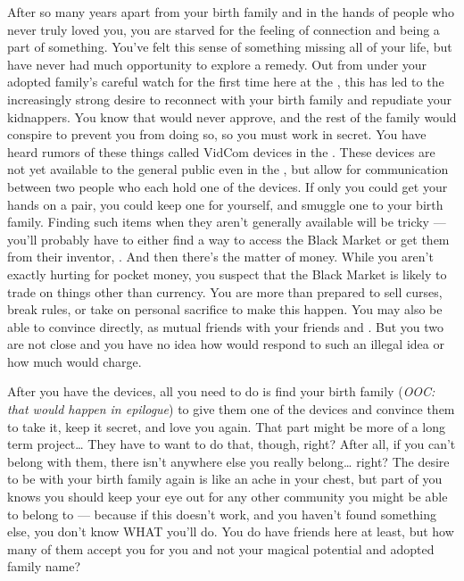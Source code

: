 \documentclass[char]{GL2020}
\begin{document}
After so many years apart from your birth family and in the hands of people who never truly loved you, you are starved for the feeling of connection and being a part of something. You've felt this sense of something missing all of your life, but have never had much opportunity to explore a remedy. Out from under your adopted family's careful watch for the first time here at the \pSc{}, this has led to the increasingly strong desire to reconnect with your birth family and repudiate your kidnappers. You know that \cAdoptedParentOne{} would never approve, and the rest of the family would conspire to prevent you from doing so, so you must work in secret. You have heard rumors of these things called VidCom devices in the \pTech{}. These devices are not yet available to the general public even in the \pTech{}, but allow for communication between two people who each hold one of the devices. If only you could get your hands on a pair, you could keep one for yourself, and smuggle one to your birth family. Finding such items when they aren't generally available will be tricky — you'll probably have to either find a way to access the Black Market or get them from their inventor, \cTechStar{\full}. And then there's the matter of money. While you aren't exactly hurting for pocket money, you suspect that the Black Market is likely to trade on things other than \pFarm{} currency. You are more than prepared to sell curses, break rules, or take on personal sacrifice to make this happen. You may also be able to convince \cTechStar{} directly, as \cTechStar{\theyare} mutual friends with your friends \cDisney{\full} and \cPirateChild{\full}. But you two are not close and you have no idea how \cTechStar{\they} would respond to such an illegal idea or how much \cTechStar{\they} would charge.

After you have the devices, all you need to do is find your birth family (\emph{OOC: that would happen in epilogue}) to give them one of the devices and convince them to take it, keep it secret, and love you again. That part might be more of a long term project\ldots{} They have to want to do that, though, right? After all, if you can't belong with them, there isn't anywhere else you really belong\ldots{} right? The desire to be with your birth family again is like an ache in your chest, but part of you knows you should keep your eye out for any other community you might be able to belong to — because if this doesn't work, and you haven’t found something else, you don't know WHAT you'll do. You do have friends here at least, but how many of them accept you for you and not your magical potential and adopted family name?
\end{document}

